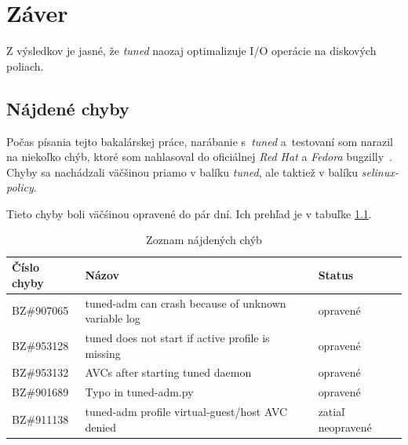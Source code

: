 %
%


%
%

\chapter{Záver}

Z výsledkov je jasné, že \emph{tuned} naozaj optimalizuje I/O operácie na diskových poliach. 

%
%

\section{Nájdené chyby}

Počas písania tejto bakalárskej práce, narábanie s~\emph{tuned} a~testovaní som
narazil na niekoľko chýb, ktoré som nahlasoval do oficiálnej \emph{Red Hat} a
\emph{Fedora} bugzilly~\cite{rhBugzilla}. Chyby sa nachádzali väčšinou priamo v
balíku \emph{tuned}, ale taktiež v balíku \emph{selinux-policy}.

Tieto chyby boli väčśinou opravené do pár dní. Ich prehľad je v tabuľke \ref{tab:bugs}.

\begin{center}
\begin{table}[H]
\begin{tabular}{|l|l|l|}
    \hline
    \textbf{Číslo chyby} & \textbf{Názov} & \textbf{Status} \\
    \hline
    BZ\#907065 & tuned-adm can crash because of unknown variable log & opravené \\
    BZ\#953128 & tuned does not start if active profile is missing & opravené \\
    BZ\#953132 & AVCs after starting tuned daemon & opravené \\
    BZ\#901689 & Typo in tuned-adm.py & opravené \\
    BZ\#911138 & tuned-adm profile virtual-guest/host AVC denied & zatiaľ neopravené \\
    \hline
\end{tabular}
\caption{Zoznam nájdených chýb}
\label{tab:bugs}
\end{table}
\end{center}

